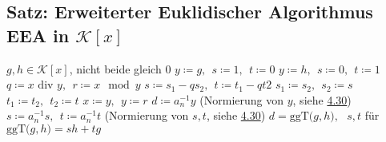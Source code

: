 \documentclass[12pt,titlepage, pdf]{article}
\newcommand{\K}{\mathcal{K}}
\newcommand{\ggT}[1]{\textrm{ggT($#1$)}}
\renewcommand{\div}{\textrm{  div }}
\renewcommand{\>}{\rightarrow}
\renewcommand{\*}{\cdot}
\begin{document}
	\subsection{Satz: Erweiterter Euklidischer Algorithmus EEA  in $\K[x]$}
	\label{4.33}
	\begin{algorithmic}[1]
		\algrenewcommand{}
		\algrenewcommand{}
		\Statex
		\Require $g,h\in \K[x]$, nicht beide gleich 0
		\State $y\coloneqq g,~~s\coloneqq 1,~~t\coloneqq0$
		\EndIf
		\State $y\coloneqq h,~~s\coloneqq 0,~~t\coloneqq1$
		\EndIf
		\State $q\coloneqq x\div y,~~r\coloneqq x\mod y$
		\State $s\coloneqq s_1-qs_2,~~t\coloneqq t_1-qt2$
		\State $s_1\coloneqq s_2,~~s_2\coloneqq s$
		\State $t_1\coloneqq t_2,~~t_2\coloneqq t$
		\State $x\coloneqq y,~~y\coloneqq r$
		\EndWhile
		\EndIf
		\State $d\coloneqq a^{-1}_ny$ (Normierung von $y$, siehe \hyperref[4.30]{4.30})
		\State $s\coloneqq a^{-1}_ns,~~t\coloneqq a^{-1}_nt$ (Normierung von $s,t$, siehe \hyperref[4.30]{4.30})
		\Ensure $d=\ggT{g,h},~~~s,t$ für $\ggT{g,h}=sh+tg$
	\end{algorithmic}
\end{document}
